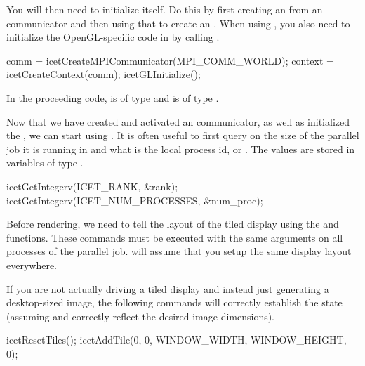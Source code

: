 You will then need to initialize \IceT itself.  Do this by first creating
an \IceT {} from an \MPI
communicator and then using that to create an
.  When using \OpenGL, you also
need to initialize the OpenGL-specific code in \IceT by calling
.

\begin{code}
comm = icetCreateMPICommunicator(MPI_COMM_WORLD);
context = icetCreateContext(comm);
icetGLInitialize();
\end{code}

In the proceeding code,  is of type
 and  is of
type .

Now that we have created and activated an \IceT communicator, as well as
initialized the \IceT {}, we can start using
\IceT.  It is often useful to first query \IceT on the size of the parallel
job it is running in and what is the local process id, or
.  The values are stored in variables of type
.

\begin{code}
icetGetIntegerv(ICET_RANK, &rank);
icetGetIntegerv(ICET_NUM_PROCESSES, &num_proc);
\end{code}

Before rendering, we need to tell \IceT the layout of the tiled display
using the  and  functions.  These
commands must be executed with the same arguments on all processes of the
parallel job.  \IceT will assume that you setup the same display layout
everywhere.

If you are not actually driving a tiled display and instead just generating
a desktop-sized image, the following commands will correctly establish the
\IceT state (assuming  and 
correctly reflect the desired image dimensions).

\begin{code}
icetResetTiles();
icetAddTile(0, 0, WINDOW_WIDTH, WINDOW_HEIGHT, 0);
\end{code}

